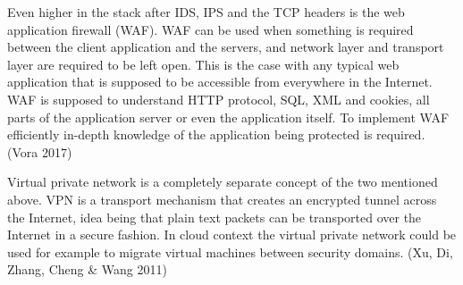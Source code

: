 \documentclass{article}
\begin{document}
\par
Even higher in the stack after IDS, IPS and the TCP headers is the web application firewall (WAF). WAF can be used when something is required between the client application and the servers, and network layer and transport layer are required to be left open. This is the case with any typical web application that is supposed to be accessible from everywhere in the Internet. WAF is supposed to understand HTTP protocol, SQL, XML and cookies, all parts of the application server or even the application itself. To implement WAF efficiently in-depth knowledge of the application being protected is required. (Vora 2017)
\par
Virtual private network is a completely separate concept of the two mentioned above. VPN is a transport mechanism that creates an encrypted tunnel across the Internet, idea being that plain text packets can be transported over the Internet in a secure fashion. In cloud context the virtual private network could be used for example to migrate virtual machines between security domains. (Xu, Di, Zhang, Cheng \& Wang 2011)
\par
\end{document}
